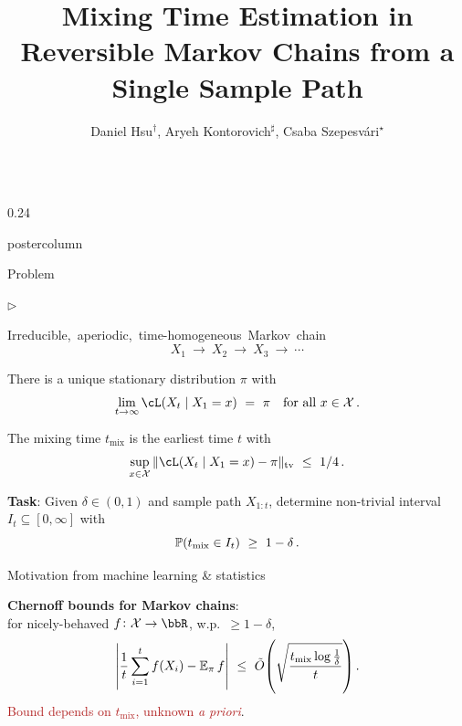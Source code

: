 \documentclass[notheorems,final]{beamer}
\title{Mixing Time Estimation in Reversible Markov Chains from a Single Sample Path}
\author{%
  Daniel Hsu$^\dag$,
  Aryeh Kontorovich$^\sharp$,
  Csaba Szepesv\'ari$^\star$%
}
\institute{%
  $^\dag$Columbia University,
  $^\sharp$Ben-Gurion University,
  $^\star$University of Alberta%
}
\newcommand{\compresslist}{%
  \setlength{\itemsep}{1pt}%
  \setlength{\parskip}{0pt}%
  \setlength{\parsep}{0pt}%
  \setlength{\leftmargin}{0.7cm}%
}
\newlength{\columnheight}
\newcommand{\GREEN}[1]{\textcolor{boldgreen}{#1}}
\newcommand{\FIREBRICK}[1]{\textcolor{firebrick}{#1}}
\newcommand\tv{\ensuremath{\operatorname{tv}}}
\newcommand\tmix{\ensuremath{t_{\operatorname{mix}}}}
\newcommand\states{\ensuremath{\mathcal{X}}}
\begin{document}
  \begin{frame}{} 
    \vfill
    \begin{columns}
      \begin{column}{0.24\textwidth}
        \begin{beamercolorbox}[center,wd=\textwidth]{postercolumn}
          \begin{minipage}[T]{.95\textwidth}
            \parbox[t][\columnheight]{\textwidth}{
              \begin{block}{Problem}
                \begin{list}{$\triangleright$}\compresslist
                  \item
                    \mbox{Irreducible, aperiodic, time-homogeneous Markov chain}
                    \[
                      X_1 \ \to \ X_2 \ \to \ X_3 \ \to \ \dotsb
                    \]

                  \item
                    There is a unique \GREEN{stationary distribution} $\pi$ with
                    \[
                      \lim_{t\to\infty}
                      \cL(X_t \mid X_1=x) \ = \ \pi
                      \quad \text{for all $x \in \states$}
                      \,.
                    \]

                  \item
                    The \GREEN{mixing time} $\tmix$ is the earliest time $t$ with
                    \[
                      \sup_{x \in \states}
                      \norm{\cL(X_t \mid X_1=x) - \pi}_{\tv}
                      \ \leq \
                      1/4
                      \,.
                    \]
                \end{list}

                \begin{center}
                  \textbf{Task}:
                  Given $\delta \in (0,1)$ and sample path $X_{1:t}$,
                  determine non-trivial interval $I_t \subseteq
                  [0,\infty]$ with
                  \[
                    \P(\tmix \in I_t) \ \geq \ 1-\delta
                    \,.
                  \]
                \end{center}
              \end{block}

              \begin{block}{Motivation from machine learning \& statistics}

                \textbf{Chernoff bounds for Markov chains}:
                \\
                for nicely-behaved $f \colon \states \to \bbR$,
                w.p.~${\geq}1-\delta$,
                \[
                  \Abs{
                    \frac1t\sum_{i=1}^t f(X_i)
                    -
                    \E_\pi f
                  }
                  \ \leq \
                  \tilde O\Parens{
                    \sqrt{
                      \frac{\tmix \log\frac1\delta}{t}
                    }
                  }
                  \,.
                \]
                \FIREBRICK{Bound depends on $\tmix$, unknown \emph{a priori}}.


\end{block}}
\end{minipage}
\end{beamercolorbox}
\end{column}
\end{columns}
\end{frame}
\end{document}
